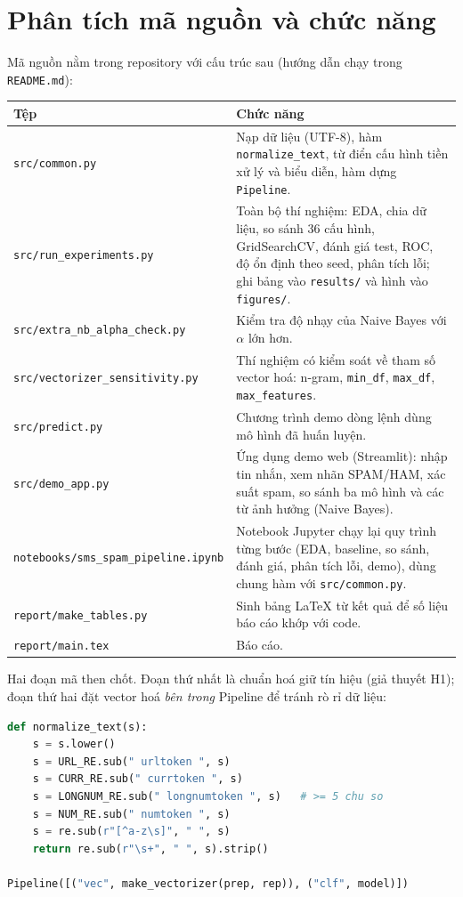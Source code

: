 \documentclass[12pt,a4paper]{article}
\begin{document}
\section{Phân tích mã nguồn và chức năng}
Mã nguồn nằm trong repository với cấu trúc sau (hướng dẫn chạy trong \texttt{README.md}):
\begin{center}\small
\begin{tabular}{lp{10.5cm}}\toprule
\textbf{Tệp} & \textbf{Chức năng}\\\midrule
\texttt{src/common.py} & Nạp dữ liệu (UTF-8), hàm \texttt{normalize\_text}, từ điển cấu hình tiền xử lý và biểu diễn, hàm dựng \texttt{Pipeline}.\\
\texttt{src/run\_experiments.py} & Toàn bộ thí nghiệm: EDA, chia dữ liệu, so sánh 36 cấu hình, GridSearchCV, đánh giá test, ROC, độ ổn định theo seed, phân tích lỗi; ghi bảng vào \texttt{results/} và hình vào \texttt{figures/}.\\
\texttt{src/extra\_nb\_alpha\_check.py} & Kiểm tra độ nhạy của Naive Bayes với $\alpha$ lớn hơn.\\
\texttt{src/vectorizer\_sensitivity.py} & Thí nghiệm có kiểm soát về tham số vector hoá: n-gram, \texttt{min\_df}, \texttt{max\_df}, \texttt{max\_features}.\\
\texttt{src/predict.py} & Chương trình demo dòng lệnh dùng mô hình đã huấn luyện.\\
\texttt{src/demo\_app.py} & Ứng dụng demo web (Streamlit): nhập tin nhắn, xem nhãn SPAM/HAM, xác suất spam, so sánh ba mô hình và các từ ảnh hưởng (Naive Bayes).\\
\texttt{notebooks/sms\_spam\_pipeline.ipynb} & Notebook Jupyter chạy lại quy trình từng bước (EDA, baseline, so sánh, đánh giá, phân tích lỗi, demo), dùng chung hàm với \texttt{src/common.py}.\\
\texttt{report/make\_tables.py} & Sinh bảng LaTeX từ kết quả để số liệu báo cáo khớp với code.\\
\texttt{report/main.tex} & Báo cáo.\\\bottomrule
\end{tabular}
\end{center}

Hai đoạn mã then chốt. Đoạn thứ nhất là chuẩn hoá giữ tín hiệu (giả thuyết H1); đoạn thứ hai đặt vector hoá \emph{bên trong} Pipeline để tránh rò rỉ dữ liệu:
\begin{lstlisting}[language=Python]
def normalize_text(s):
    s = s.lower()
    s = URL_RE.sub(" urltoken ", s)
    s = CURR_RE.sub(" currtoken ", s)
    s = LONGNUM_RE.sub(" longnumtoken ", s)   # >= 5 chu so
    s = NUM_RE.sub(" numtoken ", s)
    s = re.sub(r"[^a-z\s]", " ", s)
    return re.sub(r"\s+", " ", s).strip()

Pipeline([("vec", make_vectorizer(prep, rep)), ("clf", model)])
\end{lstlisting}
\end{document}
